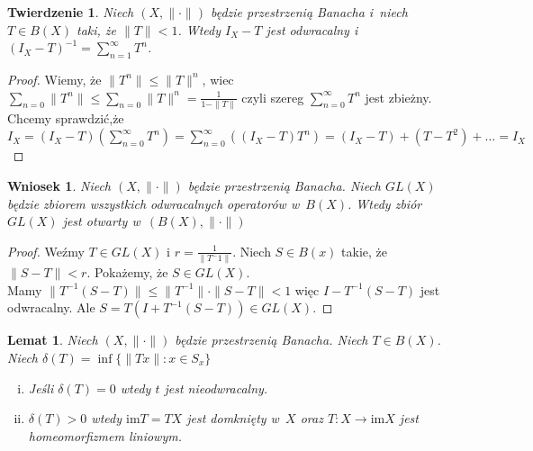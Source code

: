 \documentclass[11pt]{mwrep}
\renewcommand{\[}{\begin{equation}}
\renewcommand{\]}{\end{equation}}
\newcommand{\norm}{\|\cdot\|}
\newcommand{\im}{\mathrm{im}}
\newtheorem{twr}[subsection]{Twierdzenie}%
\newtheorem{lem}[subsection]{Lemat}
\newtheorem{wn}[subsection]{Wniosek}
\newcounter{numer}
\begin{document}
\begin{twr}
	Niech $(X,\norm)$ będzie przestrzenią Banacha i~niech $T\in B(X)$ taki, że $\|T\| <1$. Wtedy $I_X - T$ jest odwracalny i~
	$\left( I_X - T  \right)^{-1} = \sum_{n=1}^\infty T^n$.
\end{twr}
\begin{proof}
	Wiemy, że $\|T^n\|\le \|T\|^n$, wiec $\sum_{n=0}\|T^n\| \le \sum_{n=0} \|T\|^n = \frac{1}{1-\|T\|}$ czyli
	szereg $\sum_{n=0}^\infty T^n$ jest zbieżny. 
	Chcemy sprawdzić,że $I_X=(I_X -T)  \left( \sum_{n=0}^\infty T^n \right)= \sum_{n=0}^\infty \left( (I_X-T) T^n \right)=
	(I_X-T)+(T-T^2)+\ldots=I_X$
\end{proof}
\begin{wn}
	Niech $(X,\norm)$ będzie przestrzenią Banacha. Niech $GL(X)$ będzie zbiorem wszystkich odwracalnych operatorów w~$B(X)$.
	Wtedy zbiór $GL(X)$ jest otwarty w~$(B(X),\norm)$ 
\end{wn}
\begin{proof}
	Weźmy $T\in GL(X)$ i $r= \frac{1}{\|T^-1\|}$. Niech $S\in B(x)$ takie, że$\|S-T\|<r$.
	Pokażemy, że $S \in GL(X)$. \\
	Mamy $\|T^{-1}(S-T)\| \le \|T^{-1}\|\cdot\|S - T\| <1$ więc $I-T^{-1}(S - T)$ jest odwracalny.
	Ale $S= T(I+T^{-1}(S - T ))\in GL(X)$. 
\end{proof}
\begin{lem}
	Niech $(X,\norm)$ będzie przestrzenią Banacha. Niech $T \in B(X)$.
	Niech $\delta(T) = \inf\{ \|Tx\|: x \in S_x\}$ 
	\begin{enumerate}[(i)]
		\item Jeśli $\delta(T) = 0$ wtedy $t$ jest nieodwracalny.
		\item $\delta(T) >0$ wtedy $\im T =TX$ jest domknięty w~$X$ oraz $T\colon X \to \im X$ jest homeomorfizmem liniowym.
	\end{enumerate}
\end{lem}
\end{document}
